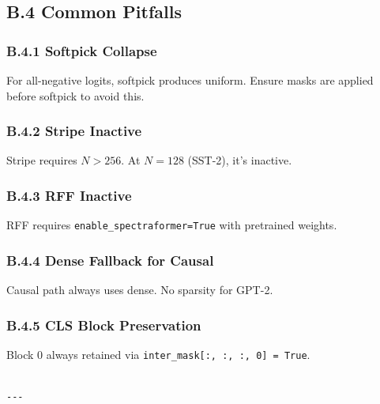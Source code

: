\subsection{B.4 Common Pitfalls}

\subsubsection{B.4.1 Softpick Collapse}

For all-negative logits, softpick produces uniform. Ensure masks are applied 
before softpick to avoid this.

\subsubsection{B.4.2 Stripe Inactive}

Stripe requires $N > 256$. At $N = 128$ (SST-2), it's inactive.

\subsubsection{B.4.3 RFF Inactive}

RFF requires \texttt{enable\_spectraformer=True} with pretrained weights.

\subsubsection{B.4.4 Dense Fallback for Causal}

Causal path always uses dense. No sparsity for GPT-2.

\subsubsection{B.4.5 CLS Block Preservation}

Block 0 always retained via \texttt{inter\_mask[:, :, :, 0] = True}.
\begin{lstlisting}

---
\end{lstlisting}
